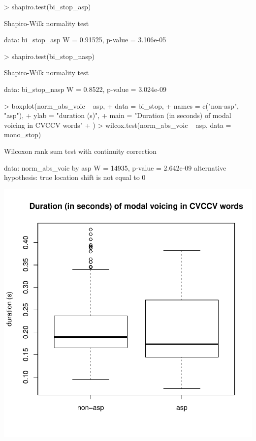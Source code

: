 \documentclass[a4paper,11pt]{article}
\begin{document}
\begin{Schunk}
\begin{Sinput}
> shapiro.test(bi_stop_asp)
\end{Sinput}
\begin{Soutput}
	Shapiro-Wilk normality test

data:  bi_stop_asp
W = 0.91525, p-value = 3.106e-05
\end{Soutput}
\begin{Sinput}
> shapiro.test(bi_stop_nasp)
\end{Sinput}
\begin{Soutput}
	Shapiro-Wilk normality test

data:  bi_stop_nasp
W = 0.8522, p-value = 3.024e-09
\end{Soutput}
\end{Schunk}

\begin{Schunk}
\begin{Sinput}
> boxplot(norm_abs_voic ~ asp,
+         data = bi_stop,
+         names = c("non-asp", "asp"),
+         ylab = "duration (s)",
+         main = "Duration (in seconds) of modal voicing in CVCCV words"
+         )
> wilcox.test(norm_abs_voic ~ asp, data = mono_stop)
\end{Sinput}
\begin{Soutput}
	Wilcoxon rank sum test with continuity correction

data:  norm_abs_voic by asp
W = 14935, p-value = 2.642e-09
alternative hypothesis: true location shift is not equal to 0
\end{Soutput}
\end{Schunk}
\includegraphics{analysis-022}
\end{document}
